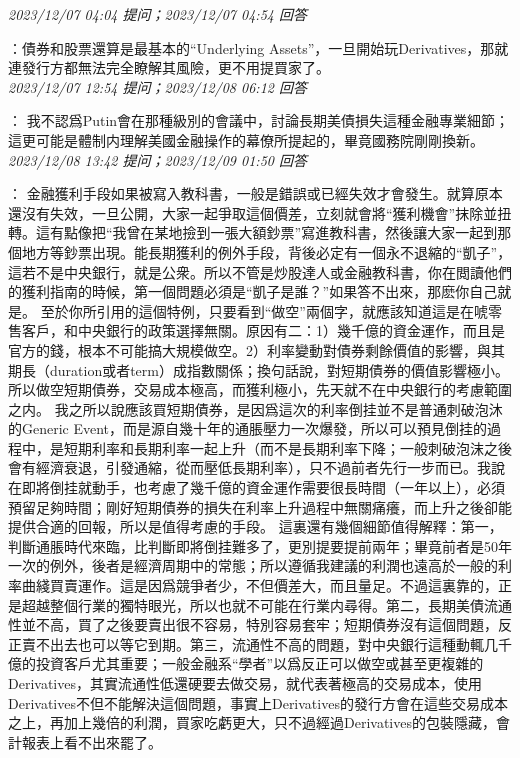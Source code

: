 \documentclass[twocolumn]{ctexart}
\begin{document}
\textit{\hfill\noindent\small 2023/12/07 04:04 提问；2023/12/07 04:54 回答}

：債券和股票還算是最基本的“Underlying Assets”，一旦開始玩Derivatives，那就連發行方都無法完全瞭解其風險，更不用提買家了。
\\

\textit{\hfill\noindent\small 2023/12/07 12:54 提问；2023/12/08 06:12 回答}

：
我不認爲Putin會在那種級別的會議中，討論長期美債損失這種金融專業細節；這更可能是體制内理解美國金融操作的幕僚所提起的，畢竟國務院剛剛換新。
\\

\textit{\hfill\noindent\small 2023/12/08 13:42 提问；2023/12/09 01:50 回答}

：
金融獲利手段如果被寫入教科書，一般是錯誤或已經失效才會發生。就算原本還沒有失效，一旦公開，大家一起爭取這個價差，立刻就會將“獲利機會”抹除並扭轉。這有點像把“我曾在某地撿到一張大額鈔票”寫進教科書，然後讓大家一起到那個地方等鈔票出現。能長期獲利的例外手段，背後必定有一個永不退縮的“凱子”，這若不是中央銀行，就是公衆。所以不管是炒股達人或金融教科書，你在閲讀他們的獲利指南的時候，第一個問題必須是“凱子是誰？”如果答不出來，那麽你自己就是。
至於你所引用的這個特例，只要看到“做空”兩個字，就應該知道這是在唬零售客戶，和中央銀行的政策選擇無關。原因有二：1）幾千億的資金運作，而且是官方的錢，根本不可能搞大規模做空。2）利率變動對債券剩餘價值的影響，與其期長（duration或者term）成指數關係；換句話說，對短期債券的價值影響極小。所以做空短期債券，交易成本極高，而獲利極小，先天就不在中央銀行的考慮範圍之内。
我之所以說應該買短期債券，是因爲這次的利率倒挂並不是普通刺破泡沐的Generic Event，而是源自幾十年的通脹壓力一次爆發，所以可以預見倒挂的過程中，是短期利率和長期利率一起上升（而不是長期利率下降；一般刺破泡沫之後會有經濟衰退，引發通縮，從而壓低長期利率），只不過前者先行一步而已。我說在即將倒挂就動手，也考慮了幾千億的資金運作需要很長時間（一年以上），必須預留足夠時間；剛好短期債券的損失在利率上升過程中無關痛癢，而上升之後卻能提供合適的回報，所以是值得考慮的手段。
這裏還有幾個細節值得解釋：第一，判斷通脹時代來臨，比判斷即將倒挂難多了，更別提要提前兩年；畢竟前者是50年一次的例外，後者是經濟周期中的常態；所以遵循我建議的利潤也遠高於一般的利率曲綫買賣運作。這是因爲競爭者少，不但價差大，而且量足。不過這裏靠的，正是超越整個行業的獨特眼光，所以也就不可能在行業内尋得。第二，長期美債流通性並不高，買了之後要賣出很不容易，特別容易套牢；短期債券沒有這個問題，反正賣不出去也可以等它到期。第三，流通性不高的問題，對中央銀行這種動輒几千億的投資客戶尤其重要；一般金融系“學者”以爲反正可以做空或甚至更複雜的Derivatives，其實流通性低還硬要去做交易，就代表著極高的交易成本，使用Derivatives不但不能解決這個問題，事實上Derivatives的發行方會在這些交易成本之上，再加上幾倍的利潤，買家吃虧更大，只不過經過Derivatives的包裝隱藏，會計報表上看不出來罷了。
\\
\end{document}
